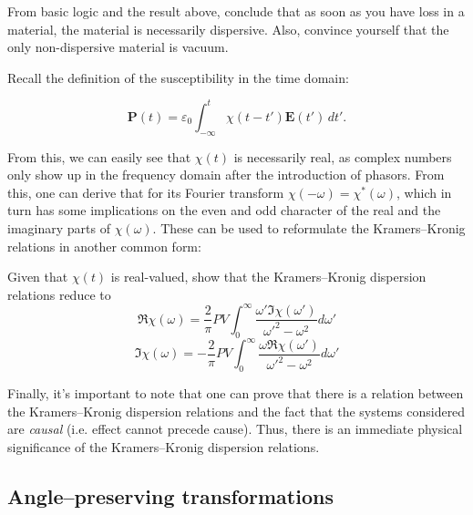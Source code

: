 \begin{exer}
From basic logic and the result above, conclude that as soon as you have loss in a material, the material is necessarily dispersive. Also, convince yourself that the only non-dispersive material is vacuum.
\end{exer}

Recall the definition of the susceptibility in the time domain:

\begin{equation}
\mathbf{P}(t)=\varepsilon_0 \int_{-\infty}^t \chi(t-t') \mathbf{E}(t')\, dt'.
\end{equation}

From this, we can easily see that $\chi(t)$ is necessarily real, as complex numbers only show up in the frequency domain after the introduction of phasors. From this, one can derive that for its Fourier transform $\chi(-\omega) = \chi^*(\omega)$, which in turn has some implications on the even and odd character of the real and the imaginary parts of $\chi(\omega)$. These can be used to reformulate the Kramers--Kronig relations in another common form:

\begin{exer}
Given that $\chi(t)$ is real-valued, show that the Kramers--Kronig dispersion relations reduce to
$$\Re \chi(\omega) =  \frac{2}{\pi} PV \int_{0}^{\infty}{ \frac{\omega'\Im \chi(\omega')}{\omega'^2-\omega^2}d\omega'}$$
$$\Im \chi(\omega) = -\frac{2}{\pi} PV \int_{0}^{\infty}{ \frac{\omega \Re \chi(\omega')}{\omega'^2-\omega^2}d\omega'}$$
\end{exer}

Finally, it's important to note that one can prove that there is a relation between the Kramers--Kronig dispersion relations and the fact that the systems considered are \emph{causal} (i.e. effect cannot precede cause)\noindent{}. Thus, there is an immediate physical significance of the Kramers--Kronig dispersion relations.


\pagebreak



\subsection*{Angle--preserving transformations}

